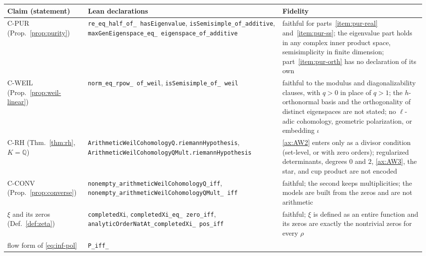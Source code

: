 \documentclass[11pt]{amsart}
\theoremstyle{plain}
\theoremstyle{definition}
\theoremstyle{remark}
\numberwithin{equation}{section}
\newcommand{\Q}{\mathbb{Q}}
\begin{document}
{\small
\setlength{\tabcolsep}{4pt}
\begin{longtable}{@{}>{\raggedright\arraybackslash}p{}
>{\raggedright\arraybackslash}p{}
>{\raggedright\arraybackslash}p{}@{}}
\toprule
Claim (statement) & Lean declarations & Fidelity\\
\midrule
\endhead
\bottomrule
\endfoot
C-PUR (Prop.~\ref{prop:purity}) &
\texttt{re\_\allowbreak{}eq\_\allowbreak{}half\_\allowbreak{}of\_\allowbreak{}%
hasEigenvalue},
\texttt{isSemisimple\_\allowbreak{}of\_\allowbreak{}additive},
\texttt{maxGenEigenspace\_\allowbreak{}eq\_\allowbreak{}%
eigenspace\_\allowbreak{}of\_\allowbreak{}additive} &
faithful for parts~\ref{item:pur-real} and~\ref{item:pur-ss}; the
eigenvalue part holds in any complex inner product space,
semisimplicity in finite dimension; part~\ref{item:pur-orth} has no
declaration of its own\\
C-WEIL (Prop.~\ref{prop:weil-linear}) &
\texttt{norm\_\allowbreak{}eq\_\allowbreak{}rpow\_\allowbreak{}%
of\_\allowbreak{}weil}, \texttt{isSemisimple\_\allowbreak{}of\_\allowbreak{}%
weil} &
faithful to the modulus and diagonalizability clauses, with $q>0$ in
place of $q>1$; the $h$-orthonormal basis and the orthogonality of
distinct eigenspaces are not stated; no $\ell$-adic cohomology,
geometric polarization, or embedding $\iota$\\
C-RH (Thm.~\ref{thm:rh}, $K=\Q$) &
\texttt{ArithmeticWeilCohomologyQ.\allowbreak{}riemannHypothesis},
\texttt{ArithmeticWeilCohomologyQMult.\allowbreak{}riemannHypothesis} &
\ref{ax:AW2} enters only as a divisor condition (set-level, or with
zero orders); regularized determinants, degrees $0$ and $2$,
\ref{ax:AW3}, the star, and cup product are not encoded\\
C-CONV (Prop.~\ref{prop:converse}) &
\texttt{nonempty\_\allowbreak{}arithmeticWeilCohomologyQ\_\allowbreak{}iff},
\texttt{nonempty\_\allowbreak{}arithmeticWeilCohomologyQMult\_\allowbreak{}%
iff} &
faithful; the second keeps multiplicities; the models are built from
the zeros and are not arithmetic\\
$\xi$ and its zeros (Def.~\ref{def:zeta}) &
\texttt{completedXi}, \texttt{completedXi\_\allowbreak{}eq\_\allowbreak{}%
zero\_\allowbreak{}iff},
\texttt{analyticOrderNatAt\_\allowbreak{}completedXi\_\allowbreak{}%
pos\_\allowbreak{}iff} &
faithful; $\xi$ is defined as an entire function and its zeros are
exactly the nontrivial zeros for every $\rho$\\
flow form of \eqref{eq:inf-pol} & \texttt{P\_\allowbreak{}iff\_\allowbreak{}%
}
\end{longtable}}
\end{document}
